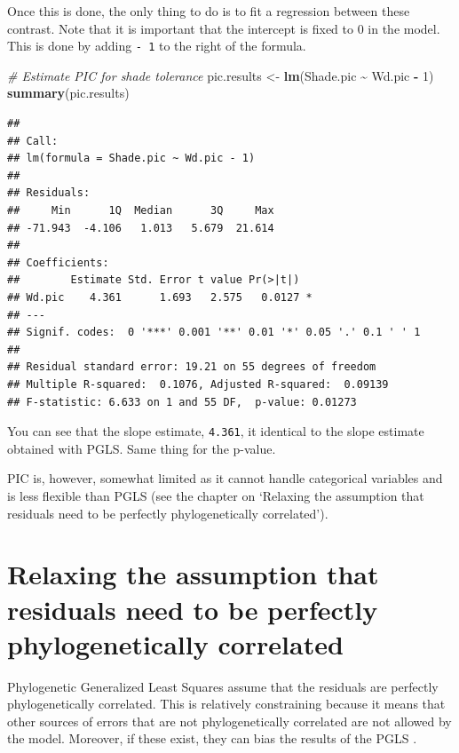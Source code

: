 \documentclass[
]{book}
\newenvironment{Shaded}{\begin{snugshade}}{\end{snugshade}}
\newcommand{\CommentTok}[1]{\textcolor[rgb]{0.56,0.35,0.01}{\textit{#1}}}
\newcommand{\DecValTok}[1]{\textcolor[rgb]{0.00,0.00,0.81}{#1}}
\newcommand{\FunctionTok}[1]{\textcolor[rgb]{0.13,0.29,0.53}{\textbf{#1}}}
\newcommand{\NormalTok}[1]{#1}
\newcommand{\OtherTok}[1]{\textcolor[rgb]{0.56,0.35,0.01}{#1}}
\newcommand{\SpecialCharTok}[1]{\textcolor[rgb]{0.81,0.36,0.00}{\textbf{#1}}}
\begin{document}
Once this is done, the only thing to do is to fit a regression between these contrast. Note that it is important that the intercept is fixed to 0 in the model. This is done by adding \texttt{-\ 1} to the right of the formula.

\begin{Shaded}
\begin{Highlighting}[]
\CommentTok{\# Estimate PIC for shade tolerance}
\NormalTok{pic.results }\OtherTok{\textless{}{-}} \FunctionTok{lm}\NormalTok{(Shade.pic }\SpecialCharTok{\textasciitilde{}}\NormalTok{ Wd.pic }\SpecialCharTok{{-}} \DecValTok{1}\NormalTok{)}
\FunctionTok{summary}\NormalTok{(pic.results)}
\end{Highlighting}
\end{Shaded}

\begin{verbatim}
## 
## Call:
## lm(formula = Shade.pic ~ Wd.pic - 1)
## 
## Residuals:
##     Min      1Q  Median      3Q     Max 
## -71.943  -4.106   1.013   5.679  21.614 
## 
## Coefficients:
##        Estimate Std. Error t value Pr(>|t|)  
## Wd.pic    4.361      1.693   2.575   0.0127 *
## ---
## Signif. codes:  0 '***' 0.001 '**' 0.01 '*' 0.05 '.' 0.1 ' ' 1
## 
## Residual standard error: 19.21 on 55 degrees of freedom
## Multiple R-squared:  0.1076, Adjusted R-squared:  0.09139 
## F-statistic: 6.633 on 1 and 55 DF,  p-value: 0.01273
\end{verbatim}

You can see that the slope estimate, \texttt{4.361}, it identical to the slope estimate obtained with PGLS. Same thing for the p-value.

PIC is, however, somewhat limited as it cannot handle categorical variables and is less flexible than PGLS (see the chapter on `Relaxing the assumption that residuals need to be perfectly phylogenetically correlated').

\chapter{Relaxing the assumption that residuals need to be perfectly phylogenetically correlated}\label{relaxing-the-assumption-that-residuals-need-to-be-perfectly-phylogenetically-correlated}

Phylogenetic Generalized Least Squares assume that the residuals are perfectly phylogenetically correlated. This is relatively constraining because it means that other sources of errors that are not phylogenetically correlated are not allowed by the model. Moreover, if these exist, they can bias the results of the PGLS \citep{revell2010phylogenetic}.
\end{document}
